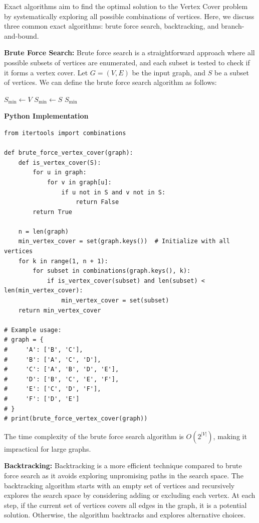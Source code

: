 \documentclass[12pt]{book} %
\begin{document}
Exact algorithms aim to find the optimal solution to the Vertex Cover problem by systematically exploring all possible combinations of vertices. Here, we discuss three common exact algorithms: brute force search, backtracking, and branch-and-bound.

\textbf{Brute Force Search:} Brute force search is a straightforward approach where all possible subsets of vertices are enumerated, and each subset is tested to check if it forms a vertex cover. Let \(G = (V, E)\) be the input graph, and \(S\) be a subset of vertices. We can define the brute force search algorithm as follows:
\FloatBarrier
\begin{algorithm}
\caption{Brute Force Vertex Cover}
\begin{algorithmic}[1]
\State $S_{\text{min}} \gets V$
        \State $S_{\text{min}} \gets S$
    \EndIf
\EndFor
\State \Return $S_{\text{min}}$
\EndFunction
\end{algorithmic}
\end{algorithm}
\FloatBarrier
\textbf{Python Implementation}
\FloatBarrier
\begin{lstlisting}
from itertools import combinations

def brute_force_vertex_cover(graph):
    def is_vertex_cover(S):
        for u in graph:
            for v in graph[u]:
                if u not in S and v not in S:
                    return False
        return True
    
    n = len(graph)
    min_vertex_cover = set(graph.keys())  # Initialize with all vertices
    for k in range(1, n + 1):
        for subset in combinations(graph.keys(), k):
            if is_vertex_cover(subset) and len(subset) < len(min_vertex_cover):
                min_vertex_cover = set(subset)
    return min_vertex_cover

# Example usage:
# graph = {
#     'A': ['B', 'C'],
#     'B': ['A', 'C', 'D'],
#     'C': ['A', 'B', 'D', 'E'],
#     'D': ['B', 'C', 'E', 'F'],
#     'E': ['C', 'D', 'F'],
#     'F': ['D', 'E']
# }
# print(brute_force_vertex_cover(graph))
\end{lstlisting}

The time complexity of the brute force search algorithm is \(O(2^{|V|})\), making it impractical for large graphs.

\textbf{Backtracking:} Backtracking is a more efficient technique compared to brute force search as it avoids exploring unpromising paths in the search space. The backtracking algorithm starts with an empty set of vertices and recursively explores the search space by considering adding or excluding each vertex. At each step, if the current set of vertices covers all edges in the graph, it is a potential solution. Otherwise, the algorithm backtracks and explores alternative choices.
\end{document}
